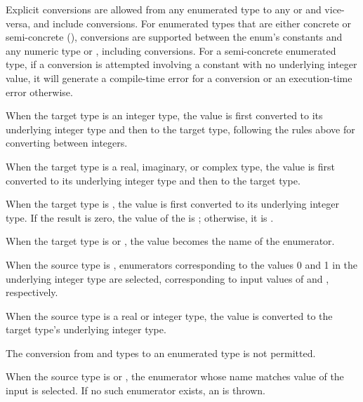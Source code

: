 Explicit conversions are allowed from any enumerated type to any
 or  and vice-versa, and include  conversions.
For enumerated types that are either concrete or semi-concrete
(), conversions are supported between the
enum's constants and any numeric type or ,
including  conversions.  For a semi-concrete enumerated
type, if a conversion is attempted involving a constant with no
underlying integer value, it will generate a compile-time error for
a  conversion or an execution-time error otherwise.

When the target type is an integer type, the value is first converted to its
underlying integer type and then to the target type, following the rules above
for converting between integers.

When the target type is a real, imaginary, or complex type, the value
is first converted to its underlying integer type and then to the
target type.

When the target type is , the value is first converted to its
underlying integer type.  If the result is zero, the value of the 
is ; otherwise, it is .

When the target type is  or , the value becomes the
name of the enumerator.

When the source type is , enumerators corresponding to the values 0
and 1 in the underlying integer type are selected, corresponding to input values
of  and , respectively.


When the source type is a real or integer type, the value is converted to the
target type's underlying integer type.

The conversion from  and  types to an enumerated type is not
permitted.

When the source type is  or , the enumerator whose name
matches value of the input is selected.  If no such enumerator exists, an
 is thrown.


